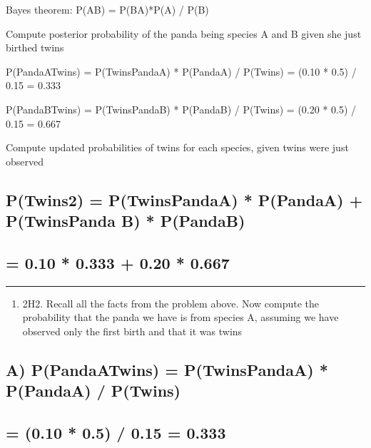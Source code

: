 \documentclass[
]{article}
\providecommand{\tightlist}{%
  \setlength{\itemsep}{0pt}\setlength{\parskip}{0pt}}
\begin{document}
Bayes theorem: P(A\textbar B) = P(B\textbar A)*P(A) / P(B)

Compute posterior probability of the panda being species A and B given
she just birthed twins

P(PandaA\textbar Twins) = P(Twins\textbar PandaA) * P(PandaA) / P(Twins)
= (0.10 * 0.5) / 0.15 = 0.333

P(PandaB\textbar Twins) = P(Twins\textbar PandaB) * P(PandaB) / P(Twins)
= (0.20 * 0.5) / 0.15 = 0.667

Compute updated probabilities of twins for each species, given twins
were just observed

\hypertarget{ptwins2-ptwinspandaa-ppandaa-ptwinspanda-b-ppandab}{%
\subsection{P(Twins2) = P(Twins\textbar PandaA) * P(PandaA) +
P(Twins\textbar Panda B) *
P(PandaB)}\label{ptwins2-ptwinspandaa-ppandaa-ptwinspanda-b-ppandab}}

\hypertarget{section}{%
\subsection{= 0.10 * 0.333 + 0.20 * 0.667}\label{section}}

\begin{center}\rule{0.5\linewidth}{0.5pt}\end{center}

\begin{enumerate}
\def\labelenumi{\Alph{enumi})}
\setcounter{enumi}{16}
\tightlist
\item
  2H2. Recall all the facts from the problem above. Now compute the
  probability that the panda we have is from species A, assuming we have
  observed only the first birth and that it was twins
\end{enumerate}

\hypertarget{a-ppandaatwins-ptwinspandaa-ppandaa-ptwins}{%
\subsection{A) P(PandaA\textbar Twins) = P(Twins\textbar PandaA) *
P(PandaA) / P(Twins)}\label{a-ppandaatwins-ptwinspandaa-ppandaa-ptwins}}

\hypertarget{section-1}{%
\subsection{= (0.10 * 0.5) / 0.15 = 0.333}\label{section-1}}
\end{document}
